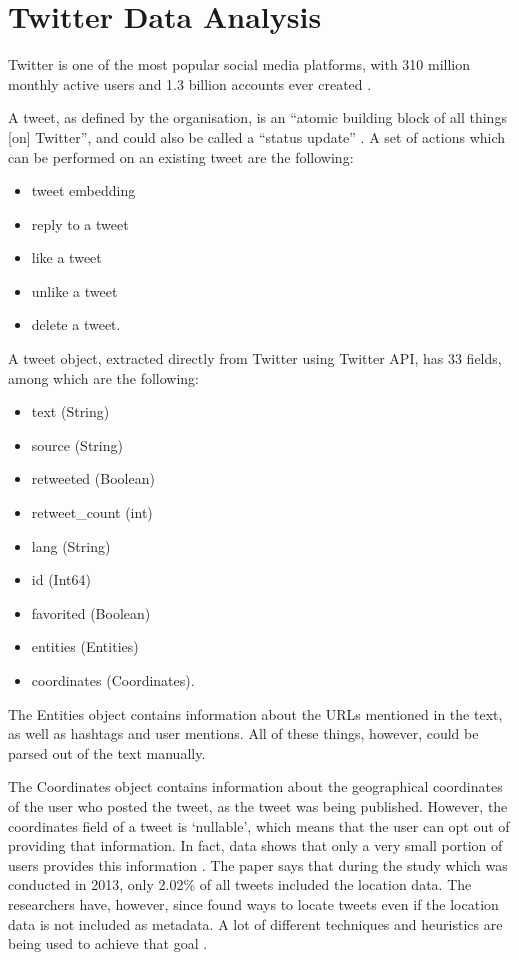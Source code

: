 \section{Twitter Data Analysis}
\label{sec:twitter_analysis}

Twitter is one of the most popular social media platforms, with 310 million monthly active users and 1.3 billion accounts ever created \cite{twittertcstats, twitterbistats}. 

A tweet, as defined by the organisation, is an ``atomic building block of all things [on] Twitter'', and could also be called a ``status update'' \cite{twitterapi}. A set of actions which can be performed on an existing tweet are the following: 
\begin{itemize}
    \item tweet embedding
    \item reply to a tweet
    \item like a tweet
    \item unlike a tweet
    \item delete a tweet.
\end{itemize} 

A tweet object, extracted directly from Twitter using Twitter API, has 33 fields, among which are the following: 

\begin{itemize}
    \item text (String)
    \item source (String)
    \item retweeted (Boolean)
    \item retweet\_count (int)
    \item lang (String)
    \item id (Int64)
    \item favorited (Boolean)
    \item entities (Entities)
    \item coordinates (Coordinates).
\end{itemize}

The Entities object contains information about the URLs mentioned in the text, as well as hashtags and user mentions. All of these things, however, could be parsed out of the text manually. 

The Coordinates object contains information about the geographical coordinates of the user who posted the tweet, as the tweet was being published. However, the coordinates field of a tweet is `nullable', which means that the user can opt out of providing that information. In fact, data shows that only a very small portion of users provides this information \cite{leetaru2013mapping}. The paper says that during the study which was conducted in 2013, only 2.02\% of all tweets included the location data. The researchers have, however, since found ways to locate tweets even if the location data is not included as metadata. A lot of different techniques and heuristics are being used to achieve that goal \cite{leetaru2013mapping, han2014text}.

